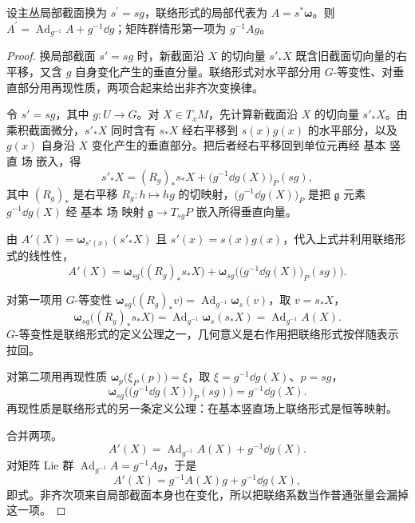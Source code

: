 \begin{proposition}[局部联络的规范变换]
设主丛局部截面换为 $s^\prime=sg$，联络形式的局部代表为 $A=s^*\boldsymbol\omega$。则 $A^\prime=\operatorname{Ad}_{g^{-1}}A+g^{-1}\dd g$；矩阵群情形第一项为 $g^{-1}Ag$。
\end{proposition}
\begin{proof}
换局部截面 $s'=sg$ 时，新截面沿 $X$ 的切向量 $s'_*X$ 既含旧截面切向量的右平移，又含 $g$ 自身变化产生的垂直分量。联络形式对水平部分用 $G$-等变性、对垂直部分用再现性质，两项合起来给出非齐次变换律。

令 $s'=sg$，其中 $g:U\to G$。对 $X\in T_xM$，先计算新截面沿 $X$ 的切向量 $s'_*X$。由乘积截面微分，$s'_*X$ 同时含有 $s_*X$ 经右平移到 $s(x)g(x)$ 的水平部分，以及 $g(x)$ 自身沿 $X$ 变化产生的垂直部分。把后者经右平移回到单位元再经 基本 竖直 场 嵌入，得
\begin{equation*}
s'_*X
=(R_g)_*s_*X+\bigl(g^{-1}\dd g(X)\bigr)_P(sg),
\end{equation*}
其中 $(R_g)_*$ 是右平移 $R_g:h\mapsto hg$ 的切映射，$\bigl(g^{-1}\dd g(X)\bigr)_P$ 是把 $\mathfrak g$ 元素 $g^{-1}\dd g(X)$ 经 基本 场 映射 $\mathfrak g\to T_{sg}P$ 嵌入所得垂直向量。

由 $A'(X)=\boldsymbol\omega_{s'(x)}(s'_*X)$ 且 $s'(x)=s(x)g(x)$，代入上式并利用联络形式的线性性，
\begin{equation*}
A'(X)
=\boldsymbol\omega_{sg}\bigl((R_g)_*s_*X\bigr)
 +\boldsymbol\omega_{sg}\bigl(\bigl(g^{-1}\dd g(X)\bigr)_P(sg)\bigr).
\end{equation*}

对第一项用 $G$-等变性 $\boldsymbol\omega_{sg}\bigl((R_g)_*v\bigr)=\operatorname{Ad}_{g^{-1}}\boldsymbol\omega_s(v)$，取 $v=s_*X$，
\begin{equation*}
\boldsymbol\omega_{sg}\bigl((R_g)_*s_*X\bigr)
=\operatorname{Ad}_{g^{-1}}\boldsymbol\omega_s(s_*X)
=\operatorname{Ad}_{g^{-1}}A(X).
\end{equation*}
$G$-等变性是联络形式的定义公理之一，几何意义是右作用把联络形式按伴随表示拉回。

对第二项用再现性质 $\boldsymbol\omega_p\bigl(\xi_P(p)\bigr)=\xi$，取 $\xi=g^{-1}\dd g(X)$、$p=sg$，
\begin{equation*}
\boldsymbol\omega_{sg}\bigl(\bigl(g^{-1}\dd g(X)\bigr)_P(sg)\bigr)
=g^{-1}\dd g(X).
\end{equation*}
再现性质是联络形式的另一条定义公理：在基本竖直场上联络形式是恒等映射。

合并两项。
\begin{equation*}
A'(X)
=\operatorname{Ad}_{g^{-1}}A(X)+g^{-1}\dd g(X).
\end{equation*}
对矩阵 Lie 群 $\operatorname{Ad}_{g^{-1}}A=g^{-1}Ag$，于是
\begin{equation*}
A'(X)=g^{-1}A(X)g+g^{-1}\dd g(X),
\end{equation*}
即式。非齐次项来自局部截面本身也在变化，所以把联络系数当作普通张量会漏掉这一项。


\end{proof}
